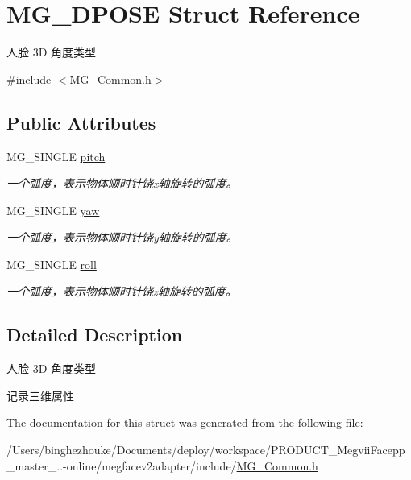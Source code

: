 \hypertarget{struct_m_g__3_d_p_o_s_e}{}\section{M\+G\+\_\+D\+P\+O\+SE Struct Reference}
\label{struct_m_g__3_d_p_o_s_e}


人脸 3D 角度类型  




{\ttfamily \#include $<$M\+G\+\_\+\+Common.\+h$>$}

\subsection*{Public Attributes}
\begin{DoxyCompactItemize}
\item 
\mbox{\label{struct_m_g__3_d_p_o_s_e_ae12f8b9ce7819c6946ab12c01792e7e6}} 
M\+G\+\_\+\+S\+I\+N\+G\+LE \hyperlink{struct_m_g__3_d_p_o_s_e_ae12f8b9ce7819c6946ab12c01792e7e6}{pitch}
\begin{DoxyCompactList}\small\item\em 一个弧度，表示物体顺时针饶x轴旋转的弧度。 \end{DoxyCompactList}\item 
\mbox{\label{struct_m_g__3_d_p_o_s_e_aba9edfa27bb55850594e0f030dee17f7}} 
M\+G\+\_\+\+S\+I\+N\+G\+LE \hyperlink{struct_m_g__3_d_p_o_s_e_aba9edfa27bb55850594e0f030dee17f7}{yaw}
\begin{DoxyCompactList}\small\item\em 一个弧度，表示物体顺时针饶y轴旋转的弧度。 \end{DoxyCompactList}\item 
\mbox{\label{struct_m_g__3_d_p_o_s_e_ac2025acd9c519bc466e9d5bec7a7782a}} 
M\+G\+\_\+\+S\+I\+N\+G\+LE \hyperlink{struct_m_g__3_d_p_o_s_e_ac2025acd9c519bc466e9d5bec7a7782a}{roll}
\begin{DoxyCompactList}\small\item\em 一个弧度，表示物体顺时针饶z轴旋转的弧度。 \end{DoxyCompactList}\end{DoxyCompactItemize}


\subsection{Detailed Description}
人脸 3D 角度类型 

记录三维属性 

The documentation for this struct was generated from the following file\+:\begin{DoxyCompactItemize}
\item 
/\+Users/binghezhouke/\+Documents/deploy/workspace/\+P\+R\+O\+D\+U\+C\+T\+\_\+\+Megvii\+Facepp\+\_\+master\+\_..-\/online/megfacev2adapter/include/\hyperlink{_m_g___common_8h}{M\+G\+\_\+\+Common.\+h}\end{DoxyCompactItemize}
